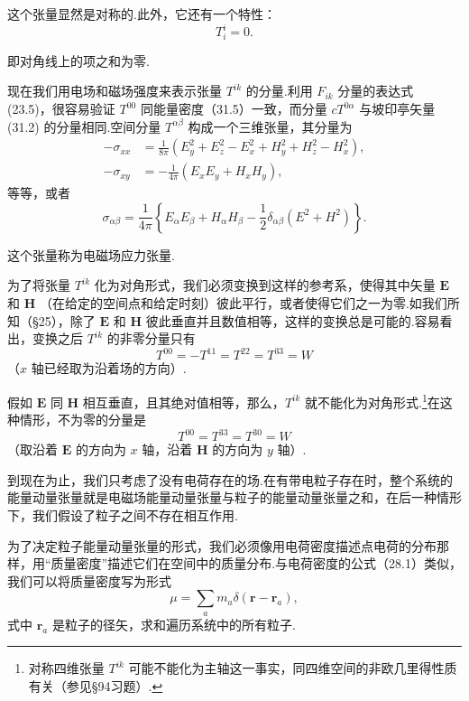 这个张量显然是对称的.此外，它还有一个特性：
\begin{equation}
  T_i^i=0.
\end{equation}

即对角线上的项之和为零.

现在我们用电场和磁场强度来表示张量 $T^{ik}$ 的分量.利用 $F_{ik}$ 分量的表达式 (23.5)，很容易验证
$T^{00}$ 同能量密度（31.5）一致，而分量 $cT^{0\alpha}$ 与坡印亭矢量 (31.2)
的分量相同.空间分量 $T^{\alpha\beta}$ 构成一个三维张量，其分量为
\begin{equation*}
\begin{aligned}
  -\sigma_{xx}&=\frac{1}{8\pi}\left(E_y^2+E_z^2-E_x^2
  +H_y^2+H_z^2-H_x^2\right),\\
  -\sigma_{xy}&=-\frac{1}{4\pi}\left(E_xE_y+H_xH_y\right),
\end{aligned}
\end{equation*}
等等，或者
\begin{equation}
  \sigma_{\alpha\beta}=\frac{1}{4\pi}\left\{E_\alpha E_\beta+H_\alpha H_\beta
  -\frac{1}{2}\delta_{\alpha\beta}\left(E^2+H^2\right)\right\}.
\end{equation}

这个张量称为电磁场应力张量.

为了将张量 $T^{ik}$
化为对角形式，我们必须变换到这样的参考系，使得其中矢量 $\boldsymbol{E}$ 和 $\boldsymbol{H}$
（在给定的空间点和给定时刻）彼此平行，或者使得它们之一为零.如我们所知（§25），除了 $\boldsymbol{E}$ 和
$\boldsymbol{H}$ 彼此垂直并且数值相等，这样的变换总是可能的.容易看出，变换之后 $T^{ik}$ 的非零分量只有
\begin{equation*}
  T^{00}=-T^{11}=T^{22}=T^{33}=W
\end{equation*}
（$x$ 轴已经取为沿着场的方向）.

假如 $\boldsymbol{E}$ 同 $\boldsymbol{H}$
相互垂直，且其绝对值相等，那么，$T^{ik}$ 就不能化为对角形式.\footnote{对称四维张量 $T^{ik}$ 可能不能化为主轴这一事实，同四维空间的非欧几里得性质有关（参见§94习题）.}在这种情形，不为零的分量是
\begin{equation*}
  T^{00}=T^{33}=T^{30}=W
\end{equation*}
（取沿着 $\boldsymbol{E}$ 的方向为 $x$ 轴，沿着 $\boldsymbol{H}$ 的方向为 $y$ 轴）.

到现在为止，我们只考虑了没有电荷存在的场.在有带电粒子存在时，整个系统的能量动量张量就是电磁场能量动量张量与粒子的能量动量张量之和，在后一种情形下，我们假设了粒子之间不存在相互作用.

为了决定粒子能量动量张量的形式，我们必须像用电荷密度描述点电荷的分布那样，用“质量密度”描述它们在空间中的质量分布.与电荷密度的公式（28.1）类似，我们可以将质量密度写为形式
\begin{equation}
  \mu=\sum_a m_a\delta(\boldsymbol{r}-\boldsymbol{r}_a),
\end{equation}
式中 $\boldsymbol{r}_a$ 是粒子的径矢，求和遍历系统中的所有粒子.

